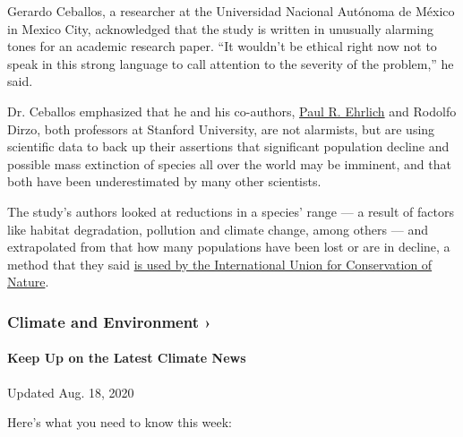 Gerardo Ceballos, a researcher at the Universidad Nacional Autónoma de
México in Mexico City, acknowledged that the study is written in
unusually alarming tones for an academic research paper. ``It wouldn't
be ethical right now not to speak in this strong language to call
attention to the severity of the problem,'' he said.

Dr. Ceballos emphasized that he and his co-authors,
\href{https://ccb.stanford.edu/paul-r-ehrlich}{Paul R. Ehrlich} and
Rodolfo Dirzo, both professors at Stanford University, are not
alarmists, but are using scientific data to back up their assertions
that significant population decline and possible mass extinction of
species all over the world may be imminent, and that both have been
underestimated by many other scientists.

The study's authors looked at reductions in a species' range --- a
result of factors like habitat degradation, pollution and climate
change, among others --- and extrapolated from that how many populations
have been lost or are in decline, a method that they said
\href{http://www.iucnredlist.org/static/categories_criteria_3_1}{is used
by the International Union for Conservation of Nature}.

\href{https://www.nytimes3xbfgragh.onion/section/climate?action=click\&pgtype=Article\&state=default\&region=MAIN_CONTENT_1\&context=storylines_keepup}{}

\hypertarget{climate-and-environment-}{%
\subsubsection{Climate and Environment
›}\label{climate-and-environment-}}

\hypertarget{keep-up-on-the-latest-climate-news}{%
\paragraph{Keep Up on the Latest Climate
News}\label{keep-up-on-the-latest-climate-news}}

Updated Aug. 18, 2020

Here's what you need to know this week:


